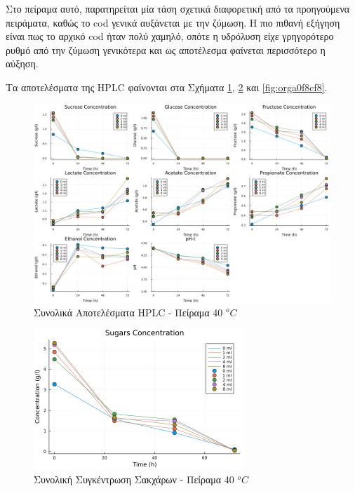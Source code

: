 \documentclass[11pt]{report}
\begin{document}
\begin{enumerate}
Στο πείραμα αυτό, παρατηρείται μία τάση σχετικά διαφορετική από τα προηγούμενα πειράματα, καθώς το \acrshort{cod} γενικά αυξάνεται με την ζύμωση. Η πιο πιθανή εξήγηση είναι πως το αρχικό \acrshort{cod} ήταν πολύ χαμηλό, οπότε η υδρόλυση είχε γρηγορότερο ρυθμό από την ζύμωση γενικότερα και ως αποτέλεσμα φαίνεται περισσότερο η αύξηση.

Τα αποτελέσματα της HPLC φαίνονται στα Σχήματα \ref{fig:orgfd90e7e}, \ref{fig:org3d74d9e} και \ref{fig:orga0f8cf8}.

\begin{figure}[htbp]
\centering
\includegraphics[width=.9\linewidth]{../plots/28_11/final_scatter_28_11.png}
\caption{\label{fig:orgfd90e7e}Συνολικά Αποτελέσματα HPLC - Πείραμα 40 \(^oC\)}
\end{figure}

\begin{figure}[htbp]
\centering
\includegraphics[width=300px]{../plots/28_11/sugars_conc_scatter_28_11.png}
\caption{\label{fig:org3d74d9e}Συνολική Συγκέντρωση Σακχάρων - Πείραμα 40 \(^oC\)}
\end{figure}


\end{enumerate}
\end{document}
